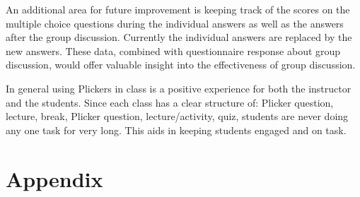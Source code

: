 \documentclass[12pt]{article}
\begin{document}
An additional area for future improvement is keeping track of the scores on the multiple choice questions during the individual answers as well as the answers after the group discussion. Currently the individual answers are replaced by the new answers. These data, combined with questionnaire response about group discussion, would offer valuable insight into the effectiveness of group discussion.

In general using Plickers in class is a positive experience for both the instructor and the students. Since each class has a clear structure of: Plicker question, lecture, break, Plicker question, lecture/activity, quiz, students are never doing any one task for very long. This aids in keeping students engaged and on task.


\vspace{4\baselineskip}\vspace{-\parskip} %
\footnotesize %



\section*{Appendix}
\end{document}
